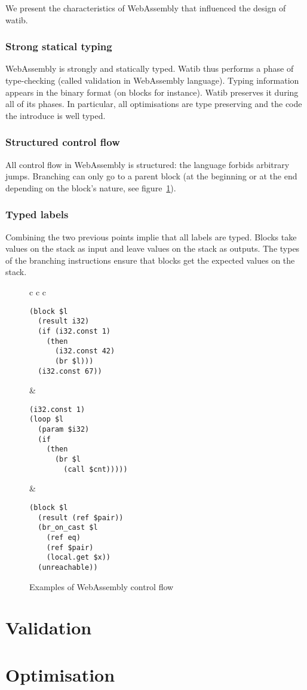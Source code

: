 \documentclass[10pt]{article}
\begin{document}
We present the characteristics of WebAssembly that influenced the design of
watib.

\subsubsection{Strong statical typing}
WebAssembly is strongly and statically typed. Watib thus performs a phase of
type-checking (called validation in WebAssembly language). Typing information
appears in the binary format (on blocks for instance). Watib preserves it during
all of its phases. In particular, all optimisations are type preserving and the
code the introduce is well typed.
\subsubsection{Structured control flow}
All control flow in WebAssembly is structured: the language forbids arbitrary
jumps. Branching can only go to a parent block (at the beginning or at the end
depending on the block's nature, see figure~\ref{cf-ex}).
\subsubsection{Typed labels}
Combining the two previous points implie that all labels are typed. Blocks take
values on the stack as input and leave values on the stack as outputs. The types
of the branching instructions ensure that blocks get the expected values on the
stack.
\begin{figure}[h]
\centering
\begin{tabular}{c c c}
\begin{minipage}{1.8in}
\begin{verbatim}
(block $l
  (result i32)
  (if (i32.const 1)
    (then
      (i32.const 42)
      (br $l)))
  (i32.const 67))
\end{verbatim}
\end{minipage}&
\begin{minipage}{1.8in}
\begin{verbatim}
(i32.const 1)
(loop $l
  (param $i32)
  (if
    (then
      (br $l
        (call $cnt)))))
\end{verbatim}
\end{minipage}
&\begin{minipage}{1.8in}
\begin{verbatim}
(block $l
  (result (ref $pair))
  (br_on_cast $l
    (ref eq)
    (ref $pair)
    (local.get $x))
  (unreachable))
\end{verbatim}
\end{minipage}
\end{tabular}
\caption{Examples of WebAssembly control flow}\label{cf-ex}
\end{figure}
\section{Validation}
\section{Optimisation}
\printbibliography
\end{document}
